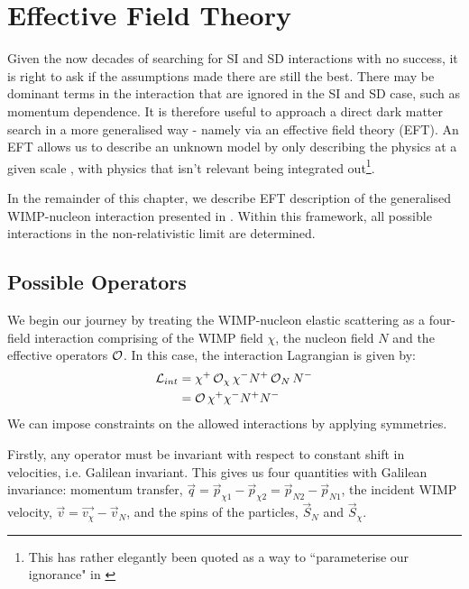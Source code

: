 \section{Effective Field Theory} \label{sec:eft_theory}

\par
Given the now decades of searching for SI and SD interactions with no success, it is right to ask if the assumptions made there are still the best.
There may be dominant terms in the interaction that are ignored in the SI and SD case, such as momentum dependence.
It is therefore useful to approach a direct dark matter search in a more generalised way - namely via an effective field theory (EFT).
An EFT allows us to describe an unknown model by only describing the physics at a given scale \cite{eft_expo_ref}, with physics that isn't relevant being integrated out\footnote{This has rather elegantly been quoted as a way to ``parameterise our ignorance" in \cite{shaunalsum_thesis_ref}}.

\par
In the remainder of this chapter, we describe EFT description of the generalised WIMP-nucleon interaction presented in \cite{Fitzpatrick_2013_ref}.
Within this framework, all possible interactions in the non-relativistic limit are determined.

\subsection{Possible Operators}

\par
We begin our journey by treating the WIMP-nucleon elastic scattering as a four-field interaction comprising of the WIMP field $\chi$, the nucleon field $N$ and the effective operators $\operatorname{\mathcal{O}}$.
In this case, the interaction Lagrangian is given by:
\begin{align}
\begin{split}
    \operatorname{\mathcal{L}}_{int} &= \chi^{+} \operatorname{\mathcal{O}}_{\chi} \chi^{-} N^{+} \operatorname{\mathcal{O}}_{N} N^{-} \\
                      &= \operatorname{\mathcal{O}} \chi^{+}\chi^{-} N^{+}N^{-}
\end{split}
\label{eq:eft_initial_lagrangian}
\end{align}
We can impose constraints on the allowed interactions by applying symmetries. 
\par
Firstly, any operator must be invariant with respect to constant shift in velocities, i.e. Galilean invariant.
This gives us four quantities with Galilean invariance: momentum transfer, $\vec{q} = \vec{p}_{\chi 1} - \vec{p}_{\chi 2} = \vec{p}_{N 2} - \vec{p}_{N 1}$, the incident WIMP velocity, $\vec{v}=\vec{v_\chi} - \vec{v}_N$, and the spins of the particles, $\vec{S}_N$ and $\vec{S}_\chi$.

